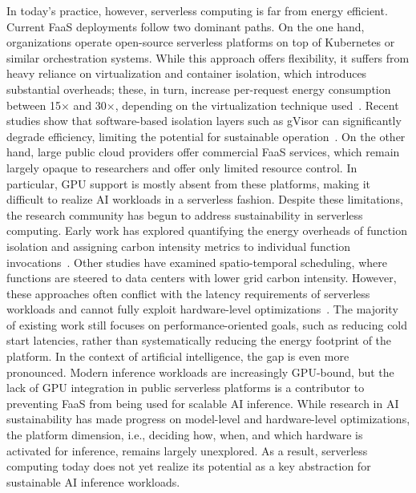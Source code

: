 In today's practice, however, serverless computing is far from energy efficient.
Current FaaS deployments follow two dominant paths. 
On the one hand, organizations operate open-source serverless platforms on top of Kubernetes or similar orchestration systems. 
While this approach offers flexibility, it suffers from heavy reliance on virtualization and container isolation, which introduces substantial overheads; these, in turn, increase per-request energy consumption between 15$\times$ and 30$\times$, depending on the virtualization technique used~\cite{sharma_challenges_2023}.
Recent studies show that software-based isolation layers such as gVisor can significantly degrade efficiency, limiting the potential for sustainable operation~\cite{young_true_nodate}. 
On the other hand, large public cloud providers offer commercial FaaS services, which remain largely opaque to researchers and offer only limited resource control. %
In particular, GPU support is mostly absent from these platforms, making it difficult to realize AI workloads in a serverless fashion.
Despite these limitations, the research community has begun to address sustainability in serverless computing. 
Early work has explored quantifying the energy overheads of function isolation and assigning carbon intensity metrics to individual function invocations~\cite{sharma_accountable_2024}.
Other studies have examined spatio-temporal scheduling, where functions are steered to data centers with lower grid carbon intensity. %
However, these approaches often conflict with the latency requirements of serverless workloads and cannot fully exploit hardware-level optimizations~\cite{sukprasert_limitations_2024}. 
The majority of existing work still focuses on performance-oriented goals, such as reducing cold start latencies, rather than systematically reducing the energy footprint of the platform. %
In the context of artificial intelligence, the gap is even more pronounced. 
Modern inference workloads are increasingly GPU-bound, but the lack of GPU integration in public serverless platforms is a contributor to preventing FaaS from being used for scalable AI inference. 
While research in AI sustainability has made progress on model-level and hardware-level optimizations, the platform dimension, i.e., deciding how, when, and which hardware is activated for inference, remains largely unexplored. %
As a result, serverless computing today does not yet realize its potential as a key abstraction for sustainable AI inference workloads.

